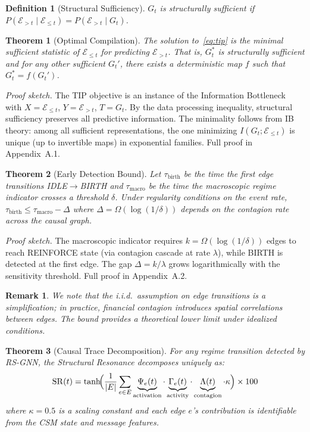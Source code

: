 \documentclass[11pt]{article}
\newtheorem{theorem}{Theorem}
\newtheorem{definition}{Definition}
\newtheorem{remark}{Remark}
\newcommand{\SR}{\mathrm{SR}}
\begin{document}
\begin{definition}[Structural Sufficiency]
$G_t$ is structurally sufficient if $P(\mathcal{E}_{>t} \mid \mathcal{E}_{\leq t}) = P(\mathcal{E}_{>t} \mid G_t)$.
\end{definition}

\begin{theorem}[Optimal Compilation]
\label{thm:optimal}
The solution to~\eqref{eq:tip} is the minimal sufficient statistic of $\mathcal{E}_{\leq t}$ for predicting $\mathcal{E}_{>t}$. That is, $G_t^*$ is structurally sufficient and for any other sufficient $G_t'$, there exists a deterministic map $f$ such that $G_t^* = f(G_t')$.
\end{theorem}

\emph{Proof sketch.} The TIP objective is an instance of the Information Bottleneck~\citep{tishby2000ib} with $X = \mathcal{E}_{\leq t}$, $Y = \mathcal{E}_{>t}$, $T = G_t$. By the data processing inequality, structural sufficiency preserves all predictive information. The minimality follows from IB theory: among all sufficient representations, the one minimizing $I(G_t; \mathcal{E}_{\leq t})$ is unique (up to invertible maps) in exponential families. Full proof in Appendix~A.1.

\begin{theorem}[Early Detection Bound]
\label{thm:early}
Let $\tau_{\text{birth}}$ be the time the first edge transitions IDLE$\to$BIRTH and $\tau_{\text{macro}}$ be the time the macroscopic regime indicator crosses a threshold $\delta$. Under regularity conditions on the event rate, $\tau_{\text{birth}} \leq \tau_{\text{macro}} - \Delta$ where $\Delta = \Omega(\log(1/\delta))$ depends on the contagion rate across the causal graph.
\end{theorem}

\emph{Proof sketch.} The macroscopic indicator requires $k = \Omega(\log(1/\delta))$ edges to reach REINFORCE state (via contagion cascade at rate $\lambda$), while BIRTH is detected at the first edge. The gap $\Delta = k/\lambda$ grows logarithmically with the sensitivity threshold. Full proof in Appendix~A.2.

\begin{remark}
We note that the i.i.d.\ assumption on edge transitions is a simplification; in practice, financial contagion introduces spatial correlations between edges. The bound provides a theoretical lower limit under idealized conditions.
\end{remark}

\begin{theorem}[Causal Trace Decomposition]
\label{thm:trace}
For any regime transition detected by RS-GNN, the Structural Resonance decomposes uniquely as:
\begin{equation}
    \SR(t) = \tanh\!\Bigl(\frac{1}{|E|}\sum_{e \in E} \underbrace{\Psi_e(t)}_{\text{activation}} \cdot \underbrace{\Gamma_e(t)}_{\text{activity}} \cdot \underbrace{\Lambda(t)}_{\text{contagion}} \cdot \kappa\Bigr) \times 100
\end{equation}
where $\kappa = 0.5$ is a scaling constant and each edge $e$'s contribution is identifiable from the CSM state and message features.
\end{theorem}
\end{document}
